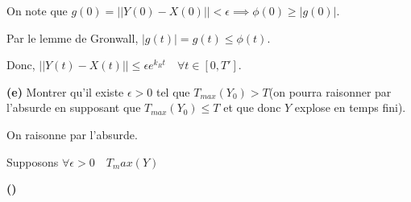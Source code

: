 \documentclass[french]{article}
\begin{document}
	On note que $g(0) = ||Y(0) - X(0)|| < \epsilon \implies \phi(0) \geq |g(0)|$.
	
	Par le lemme de Gronwall, $|g(t)| = g(t) \leq \phi(t)$.
	
	Donc, $ || Y(t) - X(t) || \leq \epsilon e^{k_Rt} \quad \forall t \in [0, T']$.
	
	\begin{tcolorbox}[colback=gray!5!white,colframe=gray!75!black]
		\textbf{\large{(e)}} Montrer qu'il existe $\epsilon > 0$ tel que $T_{max}(Y_0) > T$(on pourra raisonner par l'absurde en supposant que $T_{max}(Y_0) \leq T$ et que donc $Y$ explose en temps fini). 
	\end{tcolorbox}
	
	On raisonne par l'absurde.
	
	Supposons $\forall \epsilon > 0 \quad T_max(Y)$


	\begin{tcolorbox}[colback=gray!5!white,colframe=gray!75!black]
		\textbf{\large{()}} 
	\end{tcolorbox}
\end{document}
